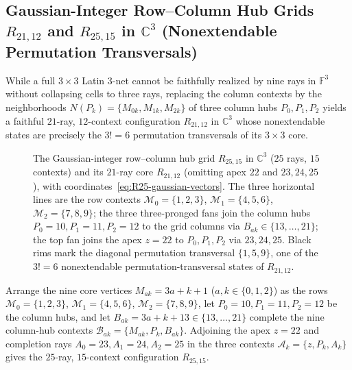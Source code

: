 \documentclass[aps,pra,reprint,superscriptaddress,longbibliography,nofootinbib,floatfix,10pt]{revtex4-2}
\theoremstyle{definition}\newtheorem{definition}[theorem]{Definition}
\theoremstyle{remark}\newtheorem{remark}[theorem]{Remark}
\begin{document}
\subsection{Gaussian-Integer Row--Column Hub Grids \texorpdfstring{$R_{21,12}$ and $R_{25,15}$}{R21,12 and R25,15} in \texorpdfstring{$\mathbb C^3$}{C3} (Nonextendable Permutation Transversals)}\label{sec:R21-R25}

While a full $3\times 3$ Latin $3$-net cannot be faithfully realized by nine rays in $\mathbb F^3$ without collapsing cells to three rays, replacing the column contexts by the neighborhoods $N(P_k)=\{M_{0k},M_{1k},M_{2k}\}$ of three column hubs $P_0,P_1,P_2$ yields a faithful $21$-ray, $12$-context configuration $R_{21,12}$ in $\mathbb C^3$ whose nonextendable states are precisely the $3!=6$ permutation transversals of its $3\times 3$ core.

\begin{figure}[!tbp]
\centering

\caption{The Gaussian-integer row--column hub grid $R_{25,15}$ in $\mathbb C^3$ ($25$ rays, $15$ contexts) and its $21$-ray core $R_{21,12}$ (omitting apex $22$ and $23,24,25$), with coordinates~\eqref{eq:R25-gaussian-vectors}. The three horizontal lines are the row contexts $\mathcal{M}_0=\{1,2,3\}$, $\mathcal{M}_1=\{4,5,6\}$, $\mathcal{M}_2=\{7,8,9\}$; the three three-pronged fans join the column hubs $P_0=10,P_1=11,P_2=12$ to the grid columns via $B_{ak}\in\{13,\ldots,21\}$; the top fan joins the apex $z=22$ to $P_0,P_1,P_2$ via $23,24,25$. Black rims mark the diagonal permutation transversal $\{1,5,9\}$, one of the $3!=6$ nonextendable permutation-transversal states of $R_{21,12}$.}\label{fig:r25-hypergraph}
\end{figure}

Arrange the nine core vertices $M_{ak}=3a+k+1$ ($a,k\in\{0,1,2\}$) as the rows $\mathcal{M}_0=\{1,2,3\}$, $\mathcal{M}_1=\{4,5,6\}$, $\mathcal{M}_2=\{7,8,9\}$, let $P_0=10,P_1=11,P_2=12$ be the column hubs, and let $B_{ak}=3a+k+13\in\{13,\ldots,21\}$ complete the nine column-hub contexts $\mathcal{B}_{ak}=\{M_{ak},P_k,B_{ak}\}$. Adjoining the apex $z=22$ and completion rays $A_0=23,A_1=24,A_2=25$ in the three contexts $\mathcal{A}_k=\{z,P_k,A_k\}$ gives the $25$-ray, $15$-context configuration $R_{25,15}$.
\end{document}
